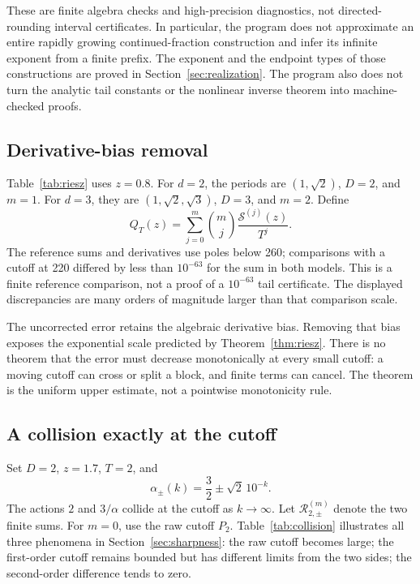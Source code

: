 \documentclass[11pt,a4paper]{article}
\numberwithin{equation}{section}
\theoremstyle{definition}
\theoremstyle{remark}
\newcommand{\Ssum}{\mathcal S}
\newcommand{\Riesz}{\mathcal R}
\begin{document}
These are finite algebra checks and high-precision diagnostics, not
directed-rounding interval certificates. In particular, the program
does not approximate an entire rapidly growing continued-fraction
construction and infer its infinite exponent from a finite prefix.
The exponent and the endpoint types of those constructions are proved
in Section~\ref{sec:realization}. The program also does not turn the
analytic tail constants or the nonlinear inverse theorem into
machine-checked proofs.

\subsection{Derivative-bias removal}
Table~\ref{tab:riesz} uses $z=0.8$. For $d=2$, the periods are
$(1,\sqrt2)$, $D=2$, and $m=1$. For $d=3$, they are
$(1,\sqrt2,\sqrt3)$, $D=3$, and $m=2$. Define
\[
 Q_T(z)=\sum_{j=0}^m\binom mj\frac{\Ssum^{(j)}(z)}{T^j}.
\]
The reference sums and derivatives use poles below 260; comparisons
with a cutoff at 220 differed by less than $10^{-63}$ for the sum in
both models. This is a finite reference comparison, not a proof of a
$10^{-63}$ tail certificate. The displayed discrepancies are many
orders of magnitude larger than that comparison scale.

\begin{table}[htbp]
\centering\small

\caption{Finite Riesz bias and its extrapolated removal at $z=0.8$.
Ordinary high-precision arithmetic; no interval enclosure is implied.}
\label{tab:riesz}
\end{table}

The uncorrected error retains the algebraic derivative bias. Removing
that bias exposes the exponential scale predicted by
Theorem~\ref{thm:riesz}. There is no theorem that the error must decrease
monotonically at every small cutoff: a moving cutoff can cross or split
a block, and finite terms can cancel. The theorem is the uniform
upper estimate, not a pointwise monotonicity rule.

\subsection{A collision exactly at the cutoff}
Set $D=2$, $z=1.7$, $T=2$, and
\[
 \alpha_\pm(k)=\frac32\pm\sqrt2\,10^{-k}.
\]
The actions $2$ and $3/\alpha$ collide at the cutoff as $k\to\infty$.
Let $\Riesz_{2,\pm}^{(m)}$ denote the two finite sums. For $m=0$,
use the raw cutoff $P_2$. Table~\ref{tab:collision} illustrates all
three phenomena in Section~\ref{sec:sharpness}: the raw cutoff becomes
large; the first-order cutoff remains bounded but has different limits
from the two sides; the second-order difference tends to zero.
\end{document}
